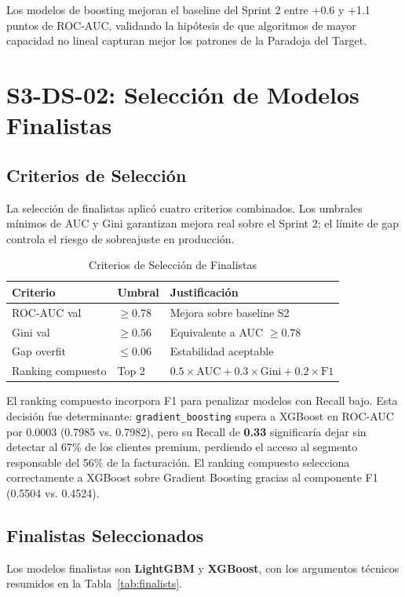 \documentclass[journal,letterpaper]{IEEEtran}
\begin{document}
Los modelos de boosting mejoran el baseline del Sprint 2 entre +0.6 y +1.1 puntos de ROC-AUC, validando la hipótesis de que algoritmos de mayor capacidad no lineal capturan mejor los patrones de la Paradoja del Target.

\section{S3-DS-02: Selección de Modelos Finalistas}

\subsection{Criterios de Selección}
La selección de finalistas aplicó cuatro criterios combinados. Los umbrales mínimos de AUC y Gini garantizan mejora real sobre el Sprint 2; el límite de gap controla el riesgo de sobreajuste en producción.

\begin{table}[h]
\centering
\caption{Criterios de Selección de Finalistas}
\label{tab:criteria}
\begin{tabular}{lll}
\toprule
Criterio & Umbral & Justificación \\
\midrule
ROC-AUC val & $\geq 0.78$ & Mejora sobre baseline S2 \\
Gini val & $\geq 0.56$ & Equivalente a AUC $\geq 0.78$ \\
Gap overfit & $\leq 0.06$ & Estabilidad aceptable \\
Ranking compuesto & Top 2 & $0.5 \times \text{AUC} + 0.3 \times \text{Gini} + 0.2 \times \text{F1}$ \\
\bottomrule
\end{tabular}
\end{table}

El ranking compuesto incorpora F1 para penalizar modelos con Recall bajo. Esta decisión fue determinante: \texttt{gradient\_boosting} supera a XGBoost en ROC-AUC por 0.0003 (0.7985 vs. 0.7982), pero su Recall de \textbf{0.33} significaría dejar sin detectar al 67\% de los clientes premium, perdiendo el acceso al segmento responsable del 56\% de la facturación. El ranking compuesto selecciona correctamente a XGBoost sobre Gradient Boosting gracias al componente F1 (0.5504 vs. 0.4524).

\subsection{Finalistas Seleccionados}
Los modelos finalistas son \textbf{LightGBM} y \textbf{XGBoost}, con los argumentos técnicos resumidos en la Tabla~\ref{tab:finalists}.
\end{document}
